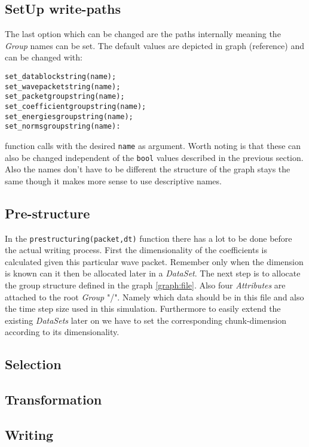 \documentclass{article}
\begin{document}
\subsection{SetUp write-paths}
The last option which can be changed are the paths internally meaning the \textit{Group} names can be set. The default values are depicted in graph (reference) and can be changed with:
\begin{lstlisting}
set_datablockstring(name);
set_wavepacketstring(name);
set_packetgroupstring(name);
set_coefficientgroupstring(name);
set_energiesgroupstring(name);
set_normsgroupstring(name):
\end{lstlisting}
function calls with the desired \texttt{name} as argument. Worth noting is that these can also be changed independent of the \texttt{bool} values described in the previous section. Also the names don't have to be different the structure of the graph stays the same though it makes more sense to use descriptive names.

\subsection{Pre-structure}
In the \texttt{prestructuring(packet,dt)} function there has a lot to be done before the actual writing process. First the dimensionality of the coefficients is calculated given this particular wave packet. Remember only when the dimension is known can it then be allocated later in a \textit{DataSet}. The next step is to allocate the group structure defined in the graph \ref{graph:file}. Also four \textit{Attributes} are attached to the root \textit{Group} "/". Namely which data should be in this file and also the time step size used in this simulation. Furthermore to easily extend the existing \textit{DataSets} later on we have to set the corresponding chunk-dimension according to its dimensionality.






\subsection{Selection}
\subsection{Transformation}
\subsection{Writing}
\end{document}
